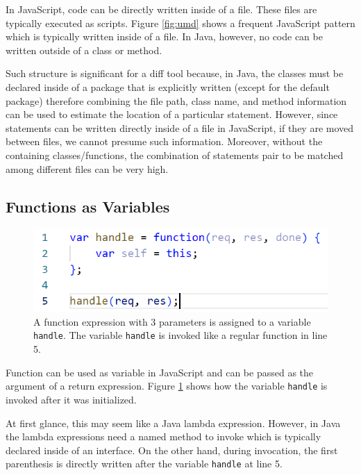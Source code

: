 \documentclass[letterpaper,12pt,onecolumn,final]{report}
\begin{document}
In JavaScript, code can be directly written inside of a file. These files are typically executed as scripts. Figure \ref{fig:umd} shows a frequent JavaScript pattern which is typically written inside of a file. In Java, however, no code can be written outside of a class or method.

Such structure is significant for a diff tool because, in Java, the classes must be declared inside of a package that is explicitly written (except for the default package) therefore combining the file path, class name, and method information can be used to estimate the location of a particular statement. However, since statements can be written directly inside of a file in JavaScript, if they are moved between files, we cannot presume such information. Moreover, without the containing classes/functions, the combination of statements pair to be matched among different files can be very high.

\subsection {Functions as Variables}

\begin{figure}
\includegraphics[width=\textwidth,height=\textheight,keepaspectratio]{images/functionvar.PNG}
  \caption{A function expression with 3 parameters is assigned to a variable \texttt{handle}. The variable \texttt{handle} is invoked like a regular function in line 5.}
   \label{fig:functionvar}
\end{figure} 

Function can be used as variable in JavaScript and can be passed as the argument of a return expression. Figure \ref{fig:functionvar} shows how the variable \texttt{handle} is invoked after it was initialized.

At first glance, this may seem like a Java lambda expression. However, in Java the lambda expressions need a named method to invoke which is typically declared inside of an interface. On the other hand, during invocation, the first parenthesis is directly written after the variable \texttt{handle} at line 5.
\end{document}

